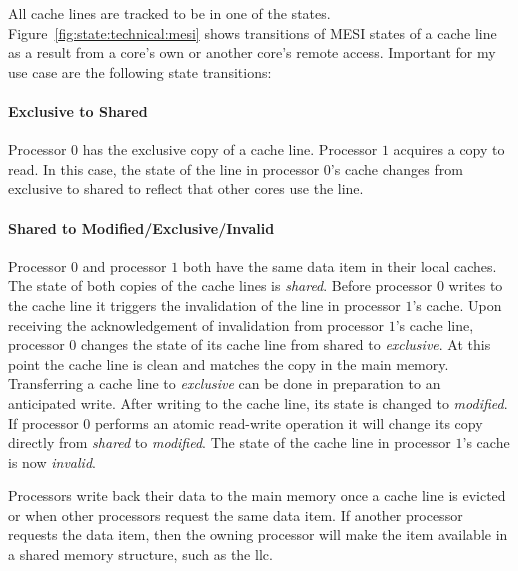 All cache lines are tracked to be in one of the states.
Figure~\ref{fig:state:technical:mesi} shows transitions of MESI
states of a cache line as a result from a core's own or another core's remote
access. Important for my use case are the following state transitions:

\paragraph{Exclusive to Shared}
Processor $0$ has the exclusive copy of a cache line. Processor $1$ acquires a
copy to read. In this case, the state of the line in processor $0$'s
cache changes from exclusive to shared to reflect that other cores use the line.

\paragraph{Shared to Modified/Exclusive/Invalid}
Processor $0$ and processor $1$ both have the same data item in their local
caches. The state of both copies of the cache lines is \textit{shared}. Before
processor $0$ writes to the cache line it triggers the invalidation of the line
in processor $1$'s cache. Upon receiving the acknowledgement of invalidation
from processor $1$'s cache line, processor $0$ changes the state of its cache
line from shared to \textit{exclusive}. At this point the cache line is clean
and matches the copy in the main memory. Transferring a cache line to
\textit{exclusive} can be done in preparation to an anticipated write. After
writing to the cache line, its state is changed to \textit{modified}. If
processor $0$ performs an atomic read-write operation it will change its copy
directly from \textit{shared} to \textit{modified}. The state of the cache line
in processor $1$'s cache is now \textit{invalid}.

Processors write back their data to the main memory once a cache line is evicted
or when other processors request the same data item. If another processor
requests the data item, then the owning processor will make the item available
in a shared memory structure, such as the \gls{llc}.

